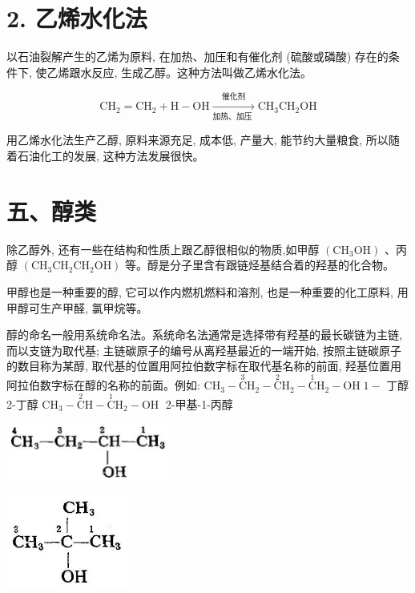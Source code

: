 \documentclass[10pt]{article}
\begin{document}
\section*{2. 乙烯水化法}

以石油裂解产生的乙烯为原料, 在加热、加压和有催化剂 (硫酸或磷酸) 存在的条件下, 使乙烯跟水反应, 生成乙醇。这种方法叫做乙烯水化法。

\[
{\mathrm{{CH}}}_{2} = {\mathrm{{CH}}}_{2} + \mathrm{H} - \mathrm{{OH}}\xrightarrow[\text{加热、加压 }]{\text{ 催化剂 }}{\mathrm{{CH}}}_{3}{\mathrm{{CH}}}_{2}\mathrm{{OH}}
\]

用乙烯水化法生产乙醇, 原料来源充足, 成本低, 产量大, 能节约大量粮食, 所以随着石油化工的发展, 这种方法发展很快。

\section*{五、醇类}

除乙醇外, 还有一些在结构和性质上跟乙醇很相似的物质,如甲醇 \(\left( {{\mathrm{{CH}}}_{3}\mathrm{{OH}}}\right)\) 、丙醇 \(\left( {{\mathrm{{CH}}}_{3}{\mathrm{{CH}}}_{2}{\mathrm{{CH}}}_{2}\mathrm{{OH}}}\right)\) 等。醇是分子里含有跟链烃基结合着的羟基的化合物。

甲醇也是一种重要的醇, 它可以作内燃机燃料和溶剂, 也是一种重要的化工原料, 用甲醇可生产甲醛, 氯甲烷等。

醇的命名一般用系统命名法。系统命名法通常是选择带有羟基的最长碳链为主链, 而以支链为取代基; 主链碳原子的编号从离羟基最近的一端开始, 按照主链碳原子的数目称为某醇, 取代基的位置用阿拉伯数字标在取代基名称的前面, 羟基位置用阿拉伯数字标在醇的名称的前面。例如: \({\mathrm{{CH}}}_{3} - \overset{3}{\mathrm{C}}{\mathrm{H}}_{2} - \overset{2}{\mathrm{C}}{\mathrm{H}}_{2} - \overset{1}{\mathrm{C}}{\mathrm{H}}_{2} - \mathrm{{OH}}\;1 -\) 丁醇 2-丁醇 \({\mathrm{{CH}}}_{3} - \overset{2}{\mathrm{C}}\mathrm{H} - \overset{1}{\mathrm{C}}{\mathrm{H}}_{2} - \mathrm{{OH}}\;\) 2-甲基-1-丙醇

\begin{center}
\includegraphics[max width=0.4\textwidth]{images/01912d16-be99-77bb-9535-4f3ed8d9946f_119_837158.jpg}
\end{center}

\begin{center}
\includegraphics[max width=0.3\textwidth]{images/01912d16-be99-77bb-9535-4f3ed8d9946f_119_340694.jpg}
\end{center}
\end{document}
